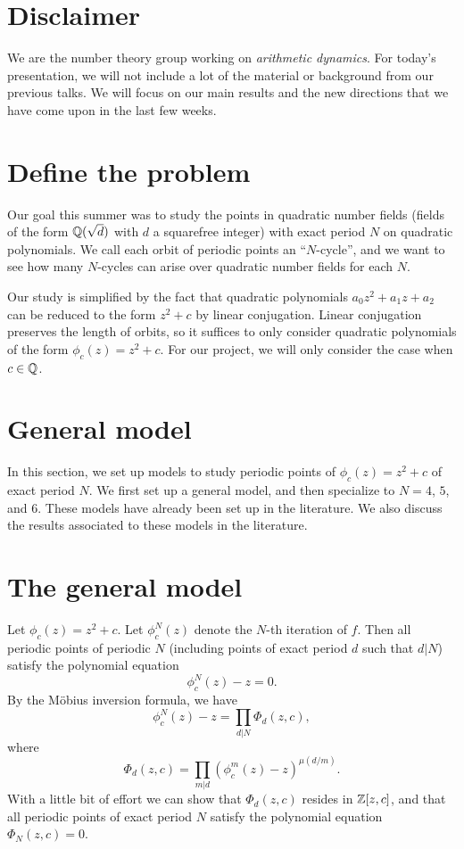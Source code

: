 




\section{Disclaimer}
\label{sec:disc}

We are the number theory group working on \emph{arithmetic dynamics}.
For today's presentation, we will not include a lot of the material or
background from our previous talks. We will focus on our main results
and the new directions that we have come upon in the last few weeks.

\section{Define the problem}
\label{sec:defprob}

Our goal this summer was to study the points in quadratic number
fields (fields of the form $\mathbb{Q}(\sqrt{d})$ with $d$ a squarefree
integer) with exact period $N$ on quadratic polynomials. We call each
orbit of periodic points an ``$N$-cycle'', and we want to see how many
$N$-cycles can arise over quadratic number fields for each $N$.

Our study is simplified by the fact that quadratic polynomials $a_0z
^2 + a_1z + a_2$ can be reduced to the form $z^2 + c$ by linear
conjugation. Linear conjugation preserves the length of orbits, so it
suffices to only consider quadratic polynomials of the form $\phi
_c(z) = z^2 + c$. For our project, we will only consider the case when
$c \in \mathbb{Q}$.

\section{General model}
\label{sec:model}

In this section, we set up models to study periodic points of
$\phi_c(z) = z^2 + c$ of exact period $N$. We first set up a general
model, and then specialize to $N = 4$, $5$, and $6$. These models have
already been set up in the literature. We also discuss the results
associated to these models in the literature.

\section{The general model}
\label{sec:model-general}

Let $\phi_c(z) = z^2 + c$. Let $\phi_c^N(z)$ denote the $N$-th
iteration of $f$. Then all periodic points of periodic $N$ (including
points of exact period $d$ such that $d | N$) satisfy the polynomial
equation
\[
\phi_c^N(z) - z = 0.
\]
By the M\"obius inversion formula, we have
\[
\phi_c^N(z) - z = \prod_{d|N} \Phi_d(z, c),
\]
where
\[
\Phi_d(z, c) = \prod_{m|d}(\phi_c^m(z) - z)^{\mu(d/m)}.
\]
With a little bit of effort we can show that $\Phi_d(z, c)$ resides in
$\mathbb{Z}[z, c]$, and that all periodic points of exact period $N$ satisfy
the polynomial equation $\Phi_N(z, c) = 0$.


